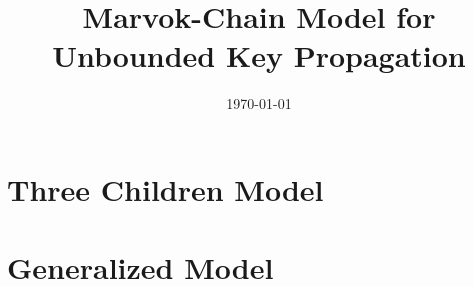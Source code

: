 \documentclass[a4paper,10pt]{article}
\title{Marvok-Chain Model for Unbounded Key Propagation}
\author{}
\date{\today}
\begin{document}
\maketitle

\section{Three Children Model}



\section{Generalized Model}


\begin{comment}
\begin{figure}[h]
\begin{center}$
\begin{array}{cc}
\texttt{[image: images\_p2/f49.eps]} &
\texttt{[image: images\_p2/f50.eps]}
\end{array}$
\end{center}
\end{figure}
\end{comment}


\end{document}
